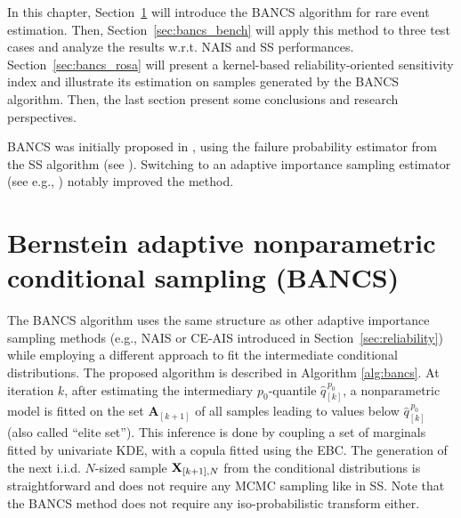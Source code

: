 In this chapter, Section~\ref{sec:bancs} will introduce the BANCS algorithm for rare event estimation. 
Then, Section~\ref{sec:bancs_bench} will apply this method to three test cases and analyze the results w.r.t. NAIS and SS performances. 
Section~\ref{sec:bancs_rosa} will present a kernel-based reliability-oriented sensitivity index and illustrate its estimation on samples generated by the BANCS algorithm. 
Then, the last section present some conclusions and research perspectives.

\medskip
\begin{remark}
    BANCS was initially proposed in \citet{fekhari_ICASP_2023}, using the failure probability estimator from the SS algorithm (see ). 
    Switching to an adaptive importance sampling estimator (see e.g., ) notably improved the method.    
\end{remark}
\medskip


\section{Bernstein adaptive nonparametric conditional sampling (BANCS)}\label{sec:bancs}

The BANCS algorithm uses the same structure as other adaptive importance sampling methods (e.g., NAIS or CE-AIS introduced in Section~\ref{sec:reliability}) while employing a different approach to fit the intermediate conditional distributions. 
The proposed algorithm is described in Algorithm \ref{alg:bancs}. 
At iteration $k$, after estimating the intermediary $p_0$-quantile $\widehat{q}_{[k]}^{\, p_0}$, a nonparametric model is fitted on the set $\mathbf{A}_{[k+1]}$ of all samples leading to values below $\widehat{q}_{[k]}^{\, p_0}$ (also called ``elite set'').  
This inference is done by coupling a set of marginals fitted by univariate KDE, with a copula fitted using the EBC. 
The generation of the next i.i.d. $N$-sized sample ${\bf X}_{[k+1], N}$ from the conditional distributions is straightforward and does not require any MCMC sampling like in SS. 
Note that the BANCS method does not require any iso-probabilistic transform either.

